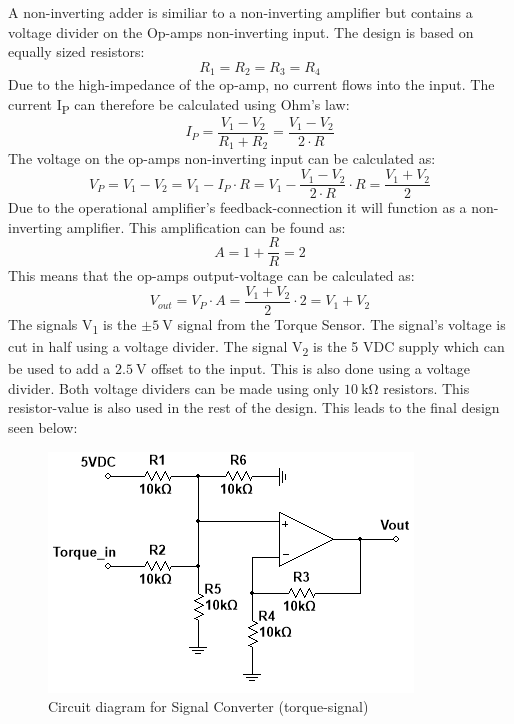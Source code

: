 A non-inverting adder is similiar to a non-inverting amplifier but contains a voltage divider on the Op-amps non-inverting input. The design is based on equally sized resistors:
\begin{equation}
	R_1 = R_2 = R_3 = R_4
\end{equation}
Due to the high-impedance of the op-amp, no current flows into the input. The current I\textsubscript{P} can therefore be calculated using Ohm's law:
\begin{equation}
	I_P = \frac{V_1 - V_2}{R_1 + R_2} = \frac{V_1 - V_2}{2 \cdot R}
\end{equation}
The voltage on the op-amps non-inverting input can be calculated as:
\begin{equation}
	V_P = V_1 - V_2 = V_1 - I_P \cdot R = V_1 - \frac{V_1 - V_2}{2 \cdot R} \cdot R = \frac{V_1 + V_2}{2}
\end{equation}
\newpage
Due to the operational amplifier's feedback-connection it will function as a non-inverting amplifier. This amplification can be found as:
\begin{equation}
	A = 1 + \frac{R}{R} = 2
\end{equation}
This means that the op-amps output-voltage can be calculated as:
\begin{equation}
	V_{out} = V_P \cdot A = \frac{V_1 + V_2}{2} \cdot 2 = V_1 + V_2
\end{equation}
The signals V\textsubscript{1} is the $\pm \SI{5}{\volt}$ signal from the Torque Sensor. The signal's voltage is cut in half using a voltage divider. The signal V\textsubscript{2} is the 5 VDC supply which can be used to add a $\SI{2.5}{\volt}$ offset to the input. This is also done using a voltage divider. Both voltage dividers can be made using only $\SI{10}{\kilo \ohm}$ resistors. This resistor-value is also used in the rest of the design. This leads to the final design seen below:

\begin{figure}[H]
	\centering
	\includegraphics[width=0.5\linewidth]{Hardware/SignalConverter/TorqueDesign2}
	\caption{Circuit diagram for Signal Converter (torque-signal)}
	\label{fig:SignalConverterTorque2}
\end{figure}